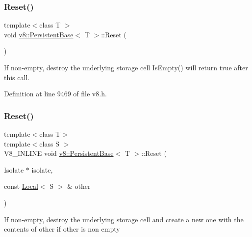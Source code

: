 \subsubsection{\texorpdfstring{Reset()}{Reset()}\hspace{0.1cm}{\footnotesize\ttfamily [1/3]}}
{\footnotesize\ttfamily template$<$class T $>$ \\
void \mbox{\hyperlink{classv8_1_1PersistentBase}{v8\+::\+Persistent\+Base}}$<$ T $>$\+::Reset (\begin{DoxyParamCaption}{ }\end{DoxyParamCaption})}

If non-\/empty, destroy the underlying storage cell Is\+Empty() will return true after this call. 

Definition at line 9469 of file v8.\+h.

\mbox{\label{classv8_1_1PersistentBase_a11164f0dfc9a16d79809236e7a9670aa}} 
\subsubsection{\texorpdfstring{Reset()}{Reset()}\hspace{0.1cm}{\footnotesize\ttfamily [2/3]}}
{\footnotesize\ttfamily template$<$class T$>$ \\
template$<$class S $>$ \\
V8\+\_\+\+I\+N\+L\+I\+NE void \mbox{\hyperlink{classv8_1_1PersistentBase}{v8\+::\+Persistent\+Base}}$<$ T $>$\+::Reset (\begin{DoxyParamCaption}\item[{Isolate $\ast$}]{isolate,  }\item[{const \mbox{\hyperlink{classv8_1_1Local}{Local}}$<$ S $>$ \&}]{other }\end{DoxyParamCaption})}

If non-\/empty, destroy the underlying storage cell and create a new one with the contents of other if other is non empty \mbox{\label{classv8_1_1PersistentBase_af6b8f929b0cbaa83341df48ca3b03ef5}} 
